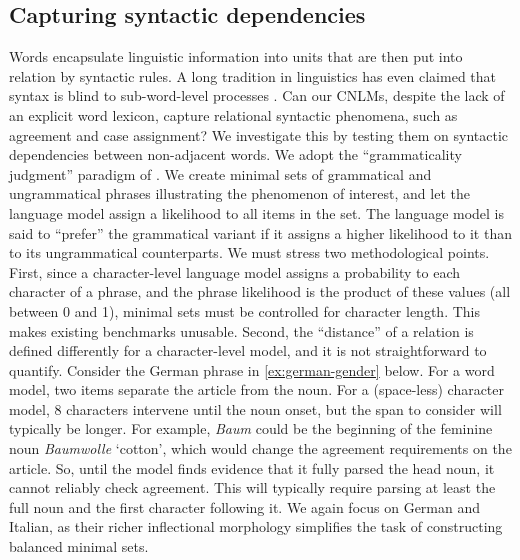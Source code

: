 \subsection{Capturing syntactic dependencies}
\label{sec:dependencies}

Words encapsulate linguistic information into units that are then put
into relation by syntactic rules. A long tradition in linguistics has
even claimed that syntax is blind to sub-word-level processes
\cite[e.g.,][]{Chomsky:1970,DiSciullo:Williams:1987,Bresnan:Mchombo:1995,Williams:2007}. Can
our CNLMs, despite the lack of an explicit word lexicon, capture
relational syntactic phenomena, such as agreement and case assignment?
We investigate this by testing them on syntactic dependencies between
non-adjacent words. We adopt the ``grammaticality judgment'' paradigm
of . We create minimal sets of grammatical
and ungrammatical phrases illustrating the phenomenon of interest, and
let the language model assign a likelihood to all items in the
set. The language model is said to ``prefer'' the grammatical variant
if it assigns a higher likelihood to it than to its ungrammatical
counterparts. We must stress two methodological points. First, since a
character-level language model assigns a probability to each character
of a phrase, and the phrase likelihood is the product of these values
(all between 0 and 1), minimal sets must be controlled for character
length. This makes existing benchmarks unusable. Second, the
``distance'' of a relation is defined differently for a
character-level model, and it is not straightforward to
quantify. Consider the German phrase in \ref{ex:german-gender}
below. For a word model, two items separate the article from the
noun. For a (space-less) character model, 8 characters intervene until
the noun onset, but the span to consider will typically be longer. For
example, \emph{Baum} could be the beginning of the feminine noun
\emph{Baumwolle} `cotton', which would change the agreement
requirements on the article. So, until the model finds evidence that
it fully parsed the head noun, it cannot reliably check
agreement. This will typically require parsing at least the full noun
and the first character following it. We again focus on German and Italian, as their richer inflectional
morphology simplifies the task of constructing balanced minimal sets.




